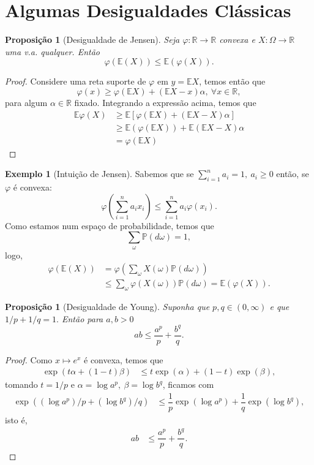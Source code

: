 \documentclass[12pt,a4paper,oneside]{book}
\newtheorem{proposition}[theorem]{Proposi\c{c}\~ao}
\theoremstyle{definition}
\newtheorem{example}[theorem]{Exemplo}
\theoremstyle{remark}
\numberwithin{equation}{section}
\newcommand{\R}{\mathbb{R}}
\newcommand{\E}{\mathbb{E}}
\newcommand{\pr}{\mathbb{P}}
\begin{document}
\newpage
\section{Algumas Desigualdades Clássicas}


\begin{proposition}[Desigualdade de Jensen]\label{JensenIneq} Seja $\varphi:\R \rightarrow \R$ convexa e $X:\Omega\rightarrow \R$ uma v.a. qualquer. Então
$$ \varphi(\E(X))\leq \E(\varphi(X)). $$
\end{proposition}
\begin{proof}
Considere uma reta suporte de $\varphi$ em $y=\E X$, temos então que
$$ \varphi(x)\geq \varphi(\E X) + (\E X-x)\alpha,\ \forall x\in \R, $$
para algum $\alpha\in\R$ fixado.
Integrando a expressão acima, temos que
\begin{align*}
\E\varphi(X) &\geq \E[\varphi(\E X) + (\E X-X)\alpha] \\
			 &\geq \E(\varphi(\E X)) + \E(\E X-X)\alpha \\
			 & = \varphi(\E X)
\end{align*}
\end{proof}


\begin{tcolorbox}
\begin{example}[Intuição de Jensen]
Sabemos que se $\sum_{i=1}^n a_i=1,\ a_i\geq 0$ então, se $\varphi$ é convexa:
$$\varphi\left(\sum_{i=1}^n a_ix_i\right)\leq\sum_{i=1}^n a_i\varphi(x_i).$$
Como estamos num espaço de probabilidade, temos que 
$$ \sum_\omega \pr(d\omega) =  1,$$
logo,
\begin{align*}
\varphi(\E(X)) &= \varphi\left(\sum_\omega X(\omega) \pr(d\omega)\right)\\
&\leq\sum_{\omega} \varphi(X(\omega))\pr(d\omega) = \E(\varphi(X)).
\end{align*}

\end{example}
\end{tcolorbox}

\begin{proposition}[Desigualdade de Young]
Suponha que $p,q\in (0,\infty)$ e que $1/p+1/q=1.$ Então para $a,b>0$
$$ab \leq \dfrac{a^p}{p}+\dfrac{b^q}{q}. $$
\end{proposition}

\begin{proof}
Como $x\mapsto e^x$ é convexa, temos que
\begin{align*}
\exp(t\alpha+(1-t)\beta) &\leq t\exp(\alpha) + (1-t)\exp(\beta),
\end{align*}
tomando $t=1/p$ e $\alpha= \log a^p,\ \beta=\log b^q$, ficamos com
\begin{align*}
\exp((\log a^p)/p+(\log b^q)/q)  &\leq \dfrac{1}{p}\exp(\log a^p)+ \dfrac{1}{q}\exp(\log b^q),
\end{align*}
isto é,
\begin{align*}
ab  &\leq \dfrac{a^p}{p}+ \dfrac{b^q}{q}.
\end{align*}
\end{proof}
\end{document}
